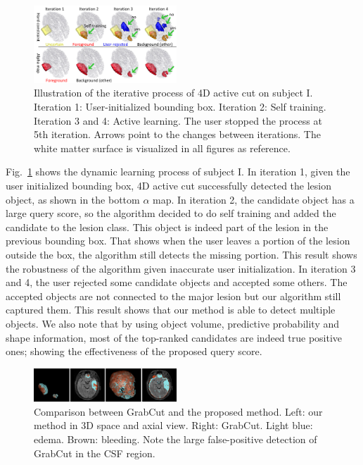 \documentclass{article}
\begin{document}
\begin{figure} [ht]
\centering
\includegraphics[width=0.479\textwidth]{./figures/iterative_process_new}
\caption{Illustration of the iterative process of 4D active cut on subject
  I. Iteration 1: User-initialized bounding box. Iteration 2: Self
  training. Iteration 3 and 4: Active learning. The user stopped the process at 5th
  iteration. Arrows point to the changes between iterations. The white matter
  surface is visualized in all figures as reference.
}
\label{fig:userinter}
\end{figure}

Fig.~\ref{fig:userinter} shows the dynamic learning process of subject I. In
iteration 1, given the user initialized bounding box, 4D active cut successfully
detected the lesion object, as shown in the bottom $\alpha$ map. In iteration 2,
the candidate object has a large query score, so the algorithm decided to do
self training and added the candidate to the lesion class. This object is indeed
part of the lesion in the previous bounding box. That shows when the user leaves
a portion of the lesion outside the box, the algorithm still detects the
missing portion. This result shows the robustness of the algorithm given
inaccurate user initialization. In iteration 3 and 4, the user rejected some
candidate objects and accepted some others.  The accepted objects are not
connected to the major lesion but our algorithm still captured them. This result
shows that our method is able to detect multiple objects. We also note that by
using object volume, predictive probability and shape information, most of the
top-ranked candidates are indeed true positive ones; showing the effectiveness
of the proposed query score.

\begin{figure} [ht]
\centering
\includegraphics[width=0.479\textwidth]{./figures/qualitative_comp}
\caption{Comparison between GrabCut and the proposed method. Left: our
  method in 3D space and axial view. Right: GrabCut. Light blue: edema. Brown:
  bleeding. Note the large false-positive detection of GrabCut in the CSF
  region.}
\label{fig:QualComp}
\end{figure}
\end{document}
